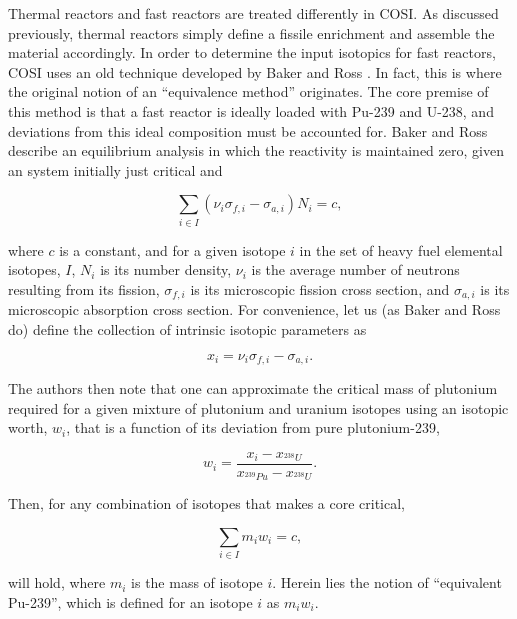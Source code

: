 Thermal reactors and fast reactors are treated differently in COSI. As discussed
previously, thermal reactors simply define a fissile enrichment and assemble the
material accordingly. In order to determine the input isotopics for fast
reactors, COSI uses an old technique developed by Baker and Ross
\cite{baker_comparison_1963}. In fact, this is where the original notion of an
``equivalence method'' originates. The core premise of this method is that a
fast reactor is ideally loaded with Pu-239 and U-238, and deviations from this
ideal composition must be accounted for. Baker and Ross describe an equilibrium
analysis in which the reactivity is maintained zero, given an system initially
just critical and

\begin{equation}
\sum_{i \in I} \left( \nu_{i} \sigma_{f,i} - \sigma_{a,i} \right) N_i = c,
\end{equation}

where $c$ is a constant, and for a given isotope $i$ in the set of heavy fuel
elemental isotopes, $I$, $N_i$ is its number density, $\nu_{i}$ is the average
number of neutrons resulting from its fission, $\sigma_{f,i}$ is its microscopic
fission cross section, and $\sigma_{a,i}$ is its microscopic absorption cross
section. For convenience, let us (as Baker and Ross do) define the collection of
intrinsic isotopic parameters as

\begin{equation}
x_i = \nu_{i} \sigma_{f,i} - \sigma_{a,i}.
\end{equation}

The authors then note that one can approximate the critical mass of plutonium
required for a given mixture of plutonium and uranium isotopes using an isotopic
worth, $w_i$, that is a function of its deviation from pure plutonium-239,

\begin{equation}
w_i = \frac{x_i - x_{^{238}U}}
           {x_{^{239}Pu} - x_{^{238}U}}.
\end{equation}

Then, for any combination of isotopes that makes a core critical, 

\begin{equation}
\sum_{i \in I} m_i w_i = c,
\end{equation}

will hold, where $m_i$ is the mass of isotope $i$. Herein lies the notion of
``equivalent Pu-239'', which is defined for an isotope $i$ as $m_i w_i$.

